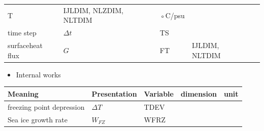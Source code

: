 \begin{longtable}[]{@{}lllll@{}}
\begin{minipage}[t]{0.06\columnwidth}
T\strut
\end{minipage} & \begin{minipage}[t]{0.13\columnwidth}\raggedright
IJLDIM, NLZDIM, NLTDIM\strut
\end{minipage} & \begin{minipage}[t]{0.04\columnwidth}\raggedright
◦C/psu\strut
\end{minipage}\tabularnewline
\begin{minipage}[t]{0.55\columnwidth}\raggedright
time step\strut
\end{minipage} & \begin{minipage}[t]{0.08\columnwidth}\raggedright
\(\Delta t\)\strut
\end{minipage} & \begin{minipage}[t]{0.06\columnwidth}\raggedright
TS\strut
\end{minipage} & \begin{minipage}[t]{0.13\columnwidth}\raggedright
\strut
\end{minipage} & \begin{minipage}[t]{0.04\columnwidth}\raggedright
\strut
\end{minipage}\tabularnewline
\begin{minipage}[t]{0.55\columnwidth}\raggedright
surfaceheat flux\strut
\end{minipage} & \begin{minipage}[t]{0.08\columnwidth}\raggedright
\(G\)\strut
\end{minipage} & \begin{minipage}[t]{0.06\columnwidth}\raggedright
FT\strut
\end{minipage} & \begin{minipage}[t]{0.13\columnwidth}\raggedright
IJLDIM, NLTDIM\strut
\end{minipage} & \begin{minipage}[t]{0.04\columnwidth}\raggedright
\strut
\end{minipage}\tabularnewline
\bottomrule
\end{longtable}

\begin{itemize}
\tightlist
\item
  Internal works
\end{itemize}

\setlength\LTleft{0pt}\setlength\LTright{0pt}\begin{longtable}[]{@{}lllll@{}}
\toprule\relax
Meaning & Presentation & Variable & dimension & unit\tabularnewline
\midrule\relax
\endhead
freezing point depression & \(\Delta T\) & TDEV & &\tabularnewline
Sea ice growth rate & \(W_{FZ}\) & WFRZ & &\tabularnewline
\bottomrule
\end{longtable}

